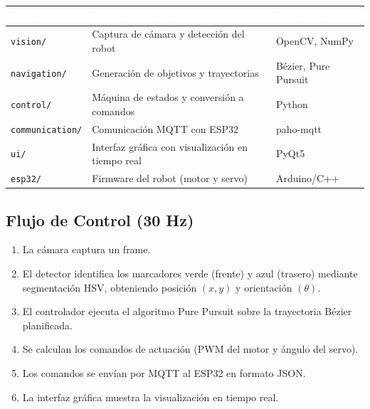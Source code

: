 \documentclass[11pt,a4paper]{article}
\begin{document}
\begin{table}[h!]
\centering
{}
\begin{tabularx}{\textwidth}{l X l}
    \toprule
    \rowcolor{azultabla}\textcolor{white}{\textbf{Módulo}} & \textcolor{white}{\textbf{Función Principal}} & \textcolor{white}{\textbf{Tecnología}} \\
    \midrule
    \texttt{vision/}         & Captura de cámara y detección del robot           & OpenCV, NumPy \\
    \texttt{navigation/}     & Generación de objetivos y trayectorias             & Bézier, Pure Pursuit \\
    \texttt{control/}        & Máquina de estados y conversión a comandos         & Python \\
    \texttt{communication/}  & Comunicación MQTT con ESP32                        & paho-mqtt \\
    \texttt{ui/}             & Interfaz gráfica con visualización en tiempo real   & PyQt5 \\
    \texttt{esp32/}          & Firmware del robot (motor y servo)                  & Arduino/C++ \\
    \bottomrule
\end{tabularx}
\end{table}

\subsection{Flujo de Control (30 Hz)}

\begin{enumerate}[nosep]
    \item La cámara captura un frame.
    \item El detector identifica los marcadores verde (frente) y azul (trasero) mediante segmentación HSV, obteniendo posición $(x, y)$ y orientación $(\theta)$.
    \item El controlador ejecuta el algoritmo Pure Pursuit sobre la trayectoria Bézier planificada.
    \item Se calculan los comandos de actuación (PWM del motor y ángulo del servo).
    \item Los comandos se envían por MQTT al ESP32 en formato JSON.
    \item La interfaz gráfica muestra la visualización en tiempo real.
\end{enumerate}

\end{document}
